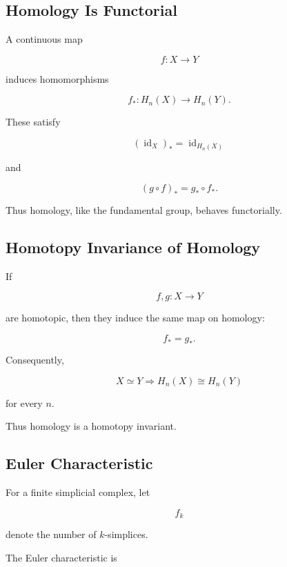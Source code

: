 \subsection{Homology Is Functorial}
\label{subsec:homology-functorial}

A continuous map

\[
f:X\to Y
\]

induces homomorphisms

\[
\boxed{
f_*:
H_n(X)
\to
H_n(Y).
}
\]

These satisfy

\[
\boxed{
(\operatorname{id}_X)_*
=
\operatorname{id}_{H_n(X)}
}
\]

and

\[
\boxed{
(g\circ f)_*
=
g_*\circ f_*.
}
\]

Thus homology, like the fundamental group, behaves functorially.

\subsection{Homotopy Invariance of Homology}
\label{subsec:homology-homotopy-invariance}

If

\[
f,g:X\to Y
\]

are homotopic, then they induce the same map on homology:

\[
\boxed{
f_*=g_*.
}
\]

Consequently,

\[
\boxed{
X\simeq Y
\Longrightarrow
H_n(X)\cong H_n(Y)
}
\]

for every \(n\).

Thus homology is a homotopy invariant.

\subsection{Euler Characteristic}
\label{subsec:euler-characteristic-topology}

For a finite simplicial complex, let

\[
f_k
\]

denote the number of \(k\)-simplices.

The Euler characteristic is

